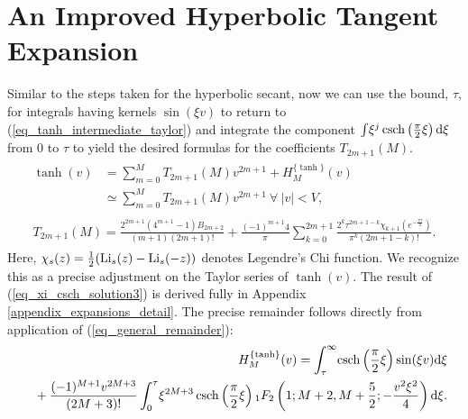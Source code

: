 \section{An Improved Hyperbolic Tangent Expansion}
Similar to the steps taken for the hyperbolic secant, now we can use the
bound, $\tau$, for integrals having kernels $\sin(\xi v)$ to return to
(\ref{eq_tanh_intermediate_taylor}) and integrate the component
$
\int \!
\xi^j\operatorname{csch}\left(\frac{\pi}{2}\xi\right)
\mathrm{d}\xi \label{eq_xi_csch_integral}
$
from $0$ to $\tau$ to yield the desired formulas for the
coefficients $T_{2m + 1}(M)$.
\begin{gather}
	\begin{split}
		\label{eq_tanh_expansion_full}
		\tanh(v) &= \sum_{m=0}^{M} T_{2m+1}(M) v^{2m+1} + H_M^{\{\tanh\}}(v) \\
		&\simeq \sum_{m=0}^{M} T_{2m+1}(M) v^{2m+1} \ \forall \ |v| < V,
	\end{split}
	\\[1ex]
	\begin{split}
		T_{2m+1}(M) = \frac{2^{2m+1}(4^{m+1}-1)B_{2m+2}}{(m+1)(2m+1)!}
		+ \frac{(-1)^{m+1}4}{\pi} \sum_{k=0}^{2m+1}
		\frac{2^k \tau^{2m+1-k}
			\chi_{k+1}\left(e^{-\frac{\pi \tau}{2}}\right)}
		{\pi^{k}(2m+1-k)!}.
		\label{eq_xi_csch_solution3}
	\end{split}
\end{gather}
Here, $\chi_s(z) = \frac{1}{2}(\operatorname{Li}_s(z) - \operatorname{Li}_s(-z))$ denotes
Legendre's Chi function.  We recognize this as a precise adjustment on the
Taylor series of $\tanh(v)$.  The result of (\ref{eq_xi_csch_solution3}) is
derived fully in Appendix \ref{appendix_expansions_detail}. The precise
remainder follows directly from application of
(\ref{eq_general_remainder}):
\begin{align}
	\begin{split}
		&H_M^{\{\tanh\}}(v) = \int_\tau^{\infty} \!
		\operatorname{csch}\left(\frac{\pi}{2}\xi\right)
		\sin(\xi v) \mathrm{d}\xi
		\label{eq_tanh_remainder2}
	\end{split}
	\\
	\begin{split}
		& \quad\quad + \frac{(-1)^{M+1}v^{2M+3}}{(2M+3)!} \int_0^{\tau} \!
		\xi^{2M+3} \operatorname{csch}\left(\frac{\pi}{2}\xi\right)
		{}_{1}F_{2}\left(1; M+2, M+\frac{5}{2}; -\frac{v^2 \xi^2}{4}\right) \mathrm{d}\xi. \label{eq_tanh_remainder1}
	\end{split}
\end{align}

